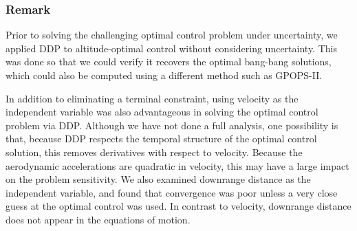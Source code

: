 \documentclass[journal ]{new-aiaa}
\begin{document}
\subsubsection*{Remark}
Prior to solving the challenging optimal control problem under uncertainty, we applied DDP to altitude-optimal control without considering uncertainty. This was done so that we could verify it recovers the optimal bang-bang solutions, which could also be computed using a different method such as GPOPS-II\cite{GPOPS2}.

In addition to eliminating a terminal constraint, using velocity as the independent variable was also advantageous in solving the optimal control problem via DDP. Although we have not done a full analysis, one possibility is that, because DDP respects the temporal structure of the optimal control solution, this removes derivatives with respect to velocity. Because the aerodynamic accelerations are quadratic in velocity, this may have a large impact on the problem sensitivity. We also examined downrange distance as the independent variable, and found that convergence was poor unless a very close guess at the optimal control was used. In contrast to velocity, downrange distance does not appear in the equations of motion. 
%
%
%
\end{document}
